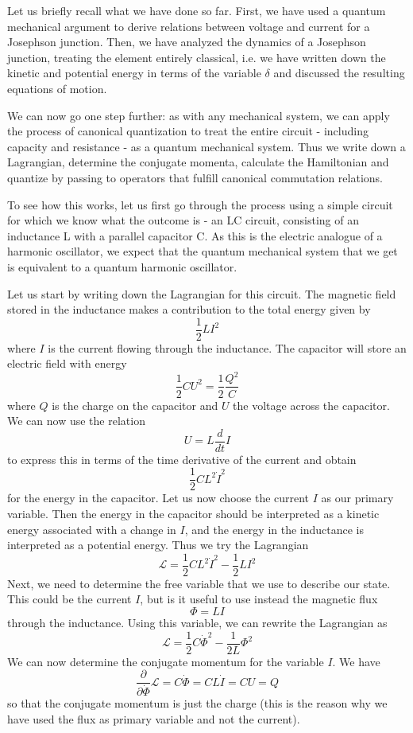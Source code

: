 \documentclass[a4paper, draft]{article}
\theoremstyle{own}
\theoremstyle{remark}
\begin{document}
Let us briefly recall what we have done so far. First, we have used a quantum mechanical argument to derive relations between voltage and current for a Josephson junction. Then, we have analyzed the dynamics of a Josephson junction, treating the element entirely classical, i.e. we have written down the kinetic and potential energy in terms of the variable $\delta$ and discussed the resulting equations of motion.

We can now go one step further: as with any mechanical system, we can apply the process of canonical quantization to treat the entire circuit - including capacity and resistance - as a quantum mechanical system. Thus we write down a Lagrangian, determine the conjugate momenta, calculate the Hamiltonian and quantize by passing to operators that fulfill canonical commutation relations.

To see how this works, let us first go through the process using a simple circuit for which we know what the outcome is - an LC circuit, consisting of an inductance L with a parallel capacitor C. As this is the electric analogue of a harmonic oscillator, we expect that the quantum mechanical system that we get is equivalent to a quantum harmonic oscillator.

Let us start by writing down the Lagrangian for this circuit. The magnetic field stored in the inductance makes a contribution to the total energy given by
$$
\frac{1}{2} L I^2
$$
where $I$ is the current flowing through the inductance. The capacitor will store an electric field with energy
$$
\frac{1}{2} C U^2 = \frac{1}{2} \frac{Q^2}{C}
$$
where $Q$ is the charge on the capacitor and $U$ the voltage across the capacitor.  We can now use the relation 
$$
U = L \frac{d}{dt} I
$$
to express this in terms of the time derivative of the current and obtain
$$
\frac{1}{2} C L^2 \dot{I}^2
$$
for the energy in the capacitor. Let us now choose the current $I$ as our primary variable. Then the energy in the capacitor should be interpreted as a kinetic energy associated with a change in $I$, and the energy in the inductance is interpreted as a potential energy. Thus we try the Lagrangian
$$
{\mathcal L} = \frac{1}{2}CL^2 \dot{I}^2 - \frac{1}{2} LI^2
$$
Next, we need to determine the free variable that we use to describe our state. This could be the current $I$, but is it useful to use instead the magnetic flux
$$
\Phi = L I
$$
through the inductance. Using this variable, we can rewrite the Lagrangian as
$$
{\mathcal L} = \frac{1}{2} C \dot{\Phi}^2 - \frac{1}{2L} \Phi^2
$$
We can now determine the conjugate momentum for the variable $I$. We have
$$
\frac{\partial}{\partial \dot{\Phi}} {\mathcal L} = C \dot{\Phi} = CL \dot{I} = CU = Q
$$
so that the conjugate momentum is just the charge (this is the reason why we have used the flux as primary variable and not the current). 
\end{document}
